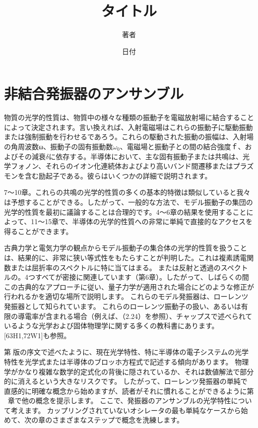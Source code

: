 \documentclass[11pt]{jsarticle}%
\title{タイトル}%
\author{著者}%
\date{日付}%
\begin{document}
\maketitle%
\tableofcontents%
\listoffigures%

\section{非結合発振器のアンサンブル}%

物質の光学的性質は、物質中の様々な種類の振動子を電磁放射場に結合することによって決定されます。言い換えれば、入射電磁場はこれらの振動子に駆動振動または強制振動を行わせるであろう。これらの駆動された振動の振幅は、入射場の角周波数ω、振動子の固有振動数$\omega_0$、電磁場と振動子との間の結合強度ｆ、およびその減衰$\delta$に依存する。半導体において、主な固有振動子または共鳴は、光学フォノン、それらのイオン化連続体およびより高いバンド間遷移またはプラズモンを含む励起子である。彼らはいくつかの詳細で説明されます。

7〜10章。これらの共鳴の光学的性質の多くの基本的特徴は類似していると我々は予想することができる。したがって、一般的な方法で、モデル振動子の集団の光学的性質を最初に議論することは合理的です。4〜6章の結果を使用することによって、11〜15章で、半導体の光学的性質への非常に単純で直接的なアクセスを得ることができます。

古典力学と電気力学の観点からモデル振動子の集合体の光学的性質を扱うことは、結果的に、非常に狭い等式性をもたらすことが判明した。これは複素誘電関数または屈折率のスペクトルに特に当てはまる。または反射と透過のスペクトルの。4つすべてが密接に関連しています（第6章）。したがって、しばらくの間この古典的なアプローチに従い、量子力学が適用された場合にどのような修正が行われるかを適切な場所で説明します。
これらのモデル発振器は、ローレンツ発振器として知られています。これらのローレンツ振動子の扱い、あるいは有限の導電率が含まれる場合（例えば、（2.24）を参照）、チャップスで述べられているような光学および固体物理学に関する多くの教科書にあります。[63H1,72W1]も参照。

第版の序文で述べたように、現在光学特性、特に半導体の電子システムの光学特性を光学式または半導体のブロッホ方程式で記述する傾向があります。
物理学がかなり複雑な数学的定式化の背後に隠されているか、それは数値解法で部分的に消えるという大きなリスクです。したがって、ローレンツ発振器の単純で直感的に明確な概念から始めますが、読者がそれに慣れることができるように第章で他の概念を提示します。
ここで、発振器のアンサンブルの光学特性について考えます。カップリングされていないオシレータの最も単純なケースから始めて、次の章のさまざまなステップで概念を洗練します。
\end{document}
